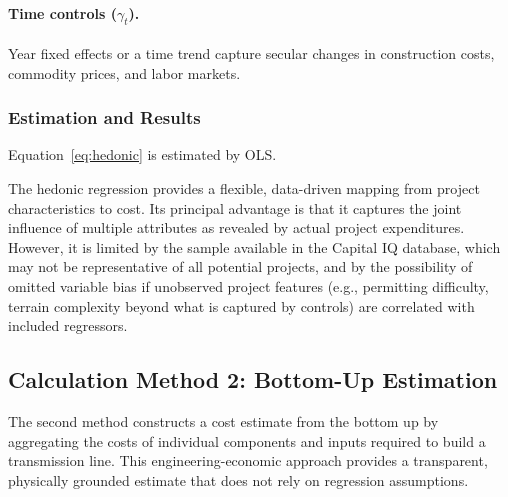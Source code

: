 \documentclass[12pt]{article}
\begin{document}
\paragraph{Time controls ($\gamma_t$).} Year fixed effects or a time trend capture secular changes in construction costs, commodity prices, and labor markets. %

\subsubsection{Estimation and Results}

Equation~\eqref{eq:hedonic} is estimated by OLS. %

% 


The hedonic regression provides a flexible, data-driven mapping from project characteristics to cost. Its principal advantage is that it captures the joint influence of multiple attributes as revealed by actual project expenditures. However, it is limited by the sample available in the Capital IQ database, which may not be representative of all potential projects, and by the possibility of omitted variable bias if unobserved project features (e.g., permitting difficulty, terrain complexity beyond what is captured by controls) are correlated with included regressors.

\subsection{Calculation Method 2: Bottom-Up Estimation}
\label{sec:bottom_up}

The second method constructs a cost estimate from the bottom up by aggregating the costs of individual components and inputs required to build a transmission line. This engineering-economic approach provides a transparent, physically grounded estimate that does not rely on regression assumptions.
\end{document}
